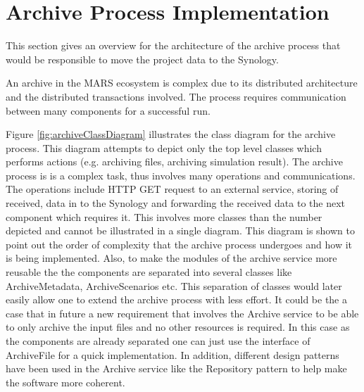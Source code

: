 \section{Archive Process Implementation}
This section gives an overview for the architecture of the archive process that would be responsible
to move the project data to the Synology. 

An archive in the MARS ecosystem is complex due to its distributed architecture and the distributed transactions involved. The process requires communication between many components for a 
successful run. %

Figure \ref{fig:archiveClassDiagram} illustrates the class diagram for the archive process. This diagram attempts to depict only the top level classes
which performs actions (e.g. archiving files, archiving simulation result). The archive process is is a complex 
task, thus involves many operations and communications. The operations include HTTP GET request to an external service, storing of received,
data in to the Synology and forwarding the received data to the next component which requires it. This involves more classes than the number depicted
and cannot be illustrated in a single diagram. This diagram is shown to point out the order of complexity that the archive process undergoes and how it is being
implemented. Also, to make the modules of the archive service more reusable the the components are separated into several classes
like ArchiveMetadata, ArchiveScenarios etc. This separation
of classes would later easily allow one to extend the archive process with less effort. It could be the a case that in future a new requirement
that involves the Archive service to be able to only archive
the input files and no other resources is required. In this case as the components are already separated one can just use the interface of ArchiveFile for a quick implementation. 
In addition, different design patterns have been used
in the Archive service like the Repository pattern \cite{repo} to help make the software more coherent.
 

